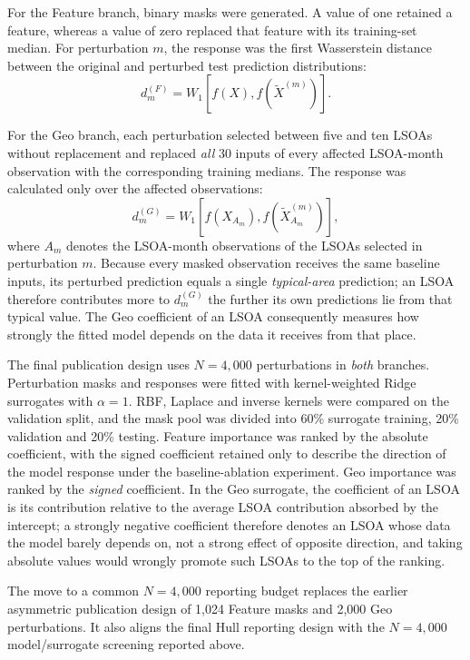 For the Feature branch, binary masks were generated. A value of one retained a feature, whereas a value of zero replaced that feature with its training-set median. For perturbation $m$, the response was the first Wasserstein distance between the original and perturbed test prediction distributions:
\begin{equation}
d_m^{(F)} =
W_1\left[
f(X),
f\left(\widetilde{X}^{(m)}\right)
\right].
\label{eq:hull_feature_response}
\end{equation}

For the Geo branch, each perturbation selected between five and ten LSOAs without replacement and replaced \emph{all} 30 inputs of every affected LSOA-month observation with the corresponding training medians. The response was calculated only over the affected observations:
\begin{equation}
d_m^{(G)} =
W_1\left[
f(X_{A_m}),
f\left(\widetilde{X}^{(m)}_{A_m}\right)
\right],
\label{eq:hull_geo_response}
\end{equation}
where $A_m$ denotes the LSOA-month observations of the LSOAs selected in perturbation $m$. Because every masked observation receives the same baseline inputs, its perturbed prediction equals a single \emph{typical-area} prediction; an LSOA therefore contributes more to $d_m^{(G)}$ the further its own predictions lie from that typical value. The Geo coefficient of an LSOA consequently measures how strongly the fitted model depends on the data it receives from that place.

The final publication design uses $N=4{,}000$ perturbations in \emph{both} branches. Perturbation masks and responses were fitted with kernel-weighted Ridge surrogates with $\alpha=1$. RBF, Laplace and inverse kernels were compared on the validation split, and the mask pool was divided into 60\% surrogate training, 20\% validation and 20\% testing. Feature importance was ranked by the absolute coefficient, with the signed coefficient retained only to describe the direction of the model response under the baseline-ablation experiment. Geo importance was ranked by the \emph{signed} coefficient. In the Geo surrogate, the coefficient of an LSOA is its contribution relative to the average LSOA contribution absorbed by the intercept; a strongly negative coefficient therefore denotes an LSOA whose data the model barely depends on, not a strong effect of opposite direction, and taking absolute values would wrongly promote such LSOAs to the top of the ranking.

The move to a common $N=4{,}000$ reporting budget replaces the earlier asymmetric publication design of 1,024 Feature masks and 2,000 Geo perturbations. It also aligns the final Hull reporting design with the $N=4{,}000$ model/surrogate screening reported above.

